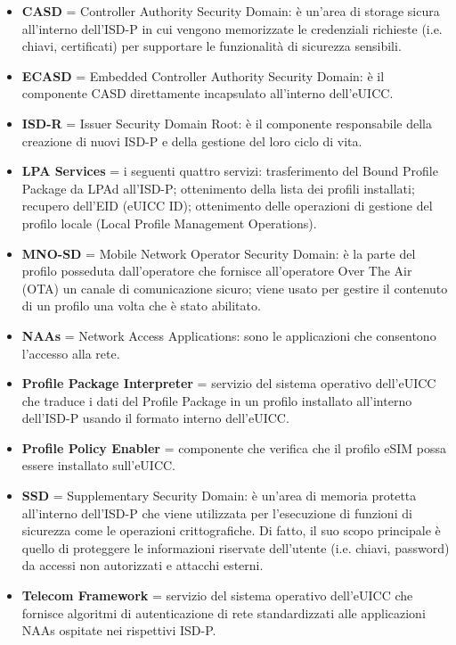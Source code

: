 \documentclass[10pt, twoside, openany]{book}
\begin{document}
\begin{itemize}
\item \textbf{CASD} = Controller Authority Security Domain: è un'area di storage sicura all'interno dell'ISD-P in cui vengono memorizzate le credenziali richieste (i.e. chiavi, certificati) per supportare le funzionalità di sicurezza sensibili.
\item \textbf{ECASD} = Embedded Controller Authority Security Domain: è il componente CASD direttamente incapsulato all'interno dell'eUICC.
\item \textbf{ISD-R} = Issuer Security Domain Root: è il componente responsabile della creazione di nuovi ISD-P e della gestione del loro ciclo di vita.
\item \textbf{LPA Services} = i seguenti quattro servizi: trasferimento del Bound Profile Package da LPAd all'ISD-P; ottenimento della lista dei profili installati; recupero dell'EID (eUICC ID); ottenimento delle operazioni di gestione del profilo locale (Local Profile Management Operations).
\item \textbf{MNO-SD} = Mobile Network Operator Security Domain: è la parte del profilo posseduta dall'operatore che fornisce all'operatore Over The Air (OTA) un canale di comunicazione sicuro; viene usato per gestire il contenuto di un profilo una volta che è stato abilitato.
\item \textbf{NAAs} = Network Access Applications: sono le applicazioni che consentono l'accesso alla rete.
\item \textbf{Profile Package Interpreter} = servizio del sistema operativo dell'eUICC che traduce i dati del Profile Package in un profilo installato all'interno dell'ISD-P usando il formato interno dell'eUICC.
\item \textbf{Profile Policy Enabler} = componente che verifica che il profilo eSIM possa essere installato sull’eUICC.
\item \textbf{SSD} = Supplementary Security Domain: è un'area di memoria protetta all'interno dell'ISD-P che viene utilizzata per l'esecuzione di funzioni di sicurezza come le operazioni crittografiche. Di fatto, il suo scopo principale è quello di proteggere le informazioni riservate dell'utente (i.e. chiavi, password) da accessi non autorizzati e attacchi esterni.
\item \textbf{Telecom Framework} = servizio del sistema operativo dell'eUICC che fornisce algoritmi di autenticazione di rete standardizzati alle applicazioni NAAs ospitate nei rispettivi ISD-P.
\end{itemize}
\end{document}
